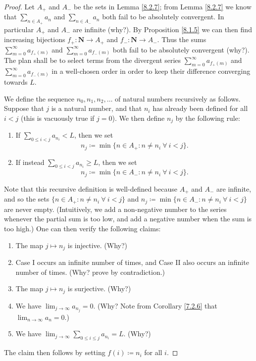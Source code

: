 \begin{proof}
Let \(A_+\) and \(A_-\) be the sets in Lemma \ref{8.2.7};
from Lemma \ref{8.2.7} we know that \(\sum_{n \in A_+} a_n\) and \(\sum_{n \in A_-} a_n\) both fail to be absolutely convergent.
In particular \(A_+\) and \(A_-\) are infinite (why?).
By Proposition \ref{8.1.5} we can then find increasing bijections \(f_+ : \mathbf{N} \to A_+\) and \(f_- : \mathbf{N} \to A_-\).
Thus the sums \(\sum_{m = 0}^\infty a_{f_+(m)}\) and \(\sum_{m = 0}^\infty a_{f_-(m)}\) both fail to be absolutely convergent (why?).
The plan shall be to select terms from the divergent series \(\sum_{m = 0}^\infty a_{f_+(m)}\) and \(\sum_{m = 0}^\infty a_{f_-(m)}\) in a well-chosen order in order to keep their difference converging towards \(L\).

We define the sequence \(n_0, n_1, n_2, \dots\) of natural numbers recursively as follows.
Suppose that \(j\) is a natural number, and that \(n_i\) has already been defined for all \(i < j\) (this is vacuously true if \(j = 0\)).
We then define \(n_j\) by the following rule:
\begin{enumerate}[label=(\Roman*)]
    \item If \(\sum_{0 \leq i < j} a_{n_i} < L\), then we set
    \[
        n_j \coloneqq \min\{n \in A_+ : n \neq n_i \ \forall\ i < j\}.
    \]
    \item If instead \(\sum_{0 \leq i < j} a_{n_i} \geq L\), then we set
    \[
        n_j \coloneqq \min\{n \in A_- : n \neq n_i \ \forall\ i < j\}.
    \]
\end{enumerate}
Note that this recursive definition is well-defined because \(A_+\) and \(A_-\) are infinite, and so the sets \(\{n \in A_+ : n \neq n_i \ \forall\ i < j\}\) and \(n_j \coloneqq \min\{n \in A_- : n \neq n_i \ \forall\ i < j\}\) are never empty.
(Intuitively, we add a non-negative number to the series whenever the partial sum is too low, and add a negative number when the sum is too high.)
One can then verify the following claims:
\begin{enumerate}
    \item The map \(j \mapsto n_j\) is injective. (Why?)
    \item Case I occurs an infinite number of times, and Case II also occurs an infinite number of times. (Why? prove by contradiction.)
    \item The map \(j \mapsto n_j\) is surjective. (Why?)
    \item We have \(\lim_{j \to \infty} a_{n_j} = 0\). (Why? Note from Corollary \ref{7.2.6} that \(\lim_{n \to \infty} a_n = 0\).)
    \item We have \(\lim_{j \to \infty} \sum_{0 \leq i \leq j} a_{n_i} = L\). (Why?)
\end{enumerate}
The claim then follows by setting \(f(i) \coloneqq n_i\) for all \(i\).
\end{proof}


